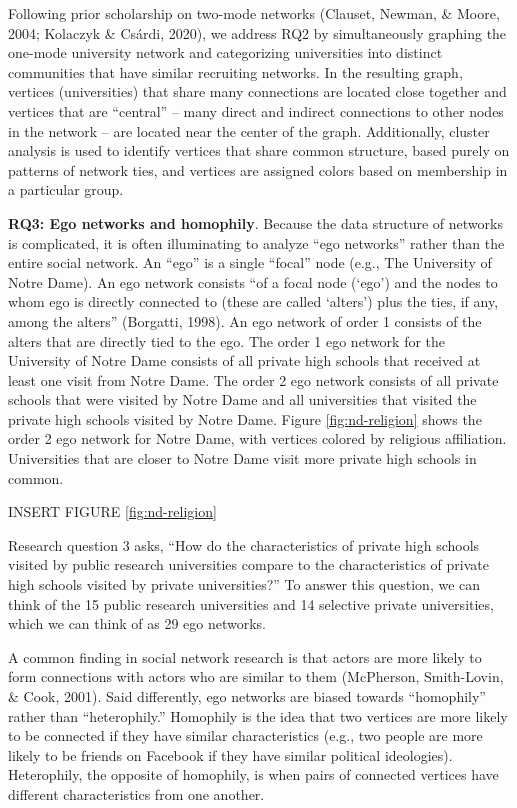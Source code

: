 \documentclass[
  12pt,
]{article}
\begin{document}
Following prior scholarship on two-mode networks (Clauset, Newman, \& Moore, 2004; Kolaczyk \& Csárdi, 2020), we address RQ2 by simultaneously graphing the one-mode university network and categorizing universities into distinct communities that have similar recruiting networks. In the resulting graph, vertices (universities) that share many connections are located close together and vertices that are ``central'' -- many direct and indirect connections to other nodes in the network -- are located near the center of the graph. Additionally, cluster analysis is used to identify vertices that share common structure, based purely on patterns of network ties, and vertices are assigned colors based on membership in a particular group.

\textbf{RQ3: Ego networks and homophily}. Because the data structure of networks is complicated, it is often illuminating to analyze ``ego networks'' rather than the entire social network. An ``ego'' is a single ``focal'' node (e.g., The University of Notre Dame). An ego network consists ``of a focal node (`ego') and the nodes to whom ego is directly connected to (these are called `alters') plus the ties, if any, among the alters'' (Borgatti, 1998). An ego network of order 1 consists of the alters that are directly tied to the ego. The order 1 ego network for the University of Notre Dame consists of all private high schools that received at least one visit from Notre Dame. The order 2 ego network consists of all private schools that were visited by Notre Dame and all universities that visited the private high schools visited by Notre Dame. Figure \ref{fig:nd-religion} shows the order 2 ego network for Notre Dame, with vertices colored by religious affiliation. Universities that are closer to Notre Dame visit more private high schools in common.

INSERT FIGURE \ref{fig:nd-religion}

Research question 3 asks, ``How do the characteristics of private high schools visited by public research universities compare to the characteristics of private high schools visited by private universities?'' To answer this question, we can think of the 15 public research universities and 14 selective private universities, which we can think of as 29 ego networks.

A common finding in social network research is that actors are more likely to form connections with actors who are similar to them (McPherson, Smith-Lovin, \& Cook, 2001). Said differently, ego networks are biased towards ``homophily'' rather than ``heterophily.'' Homophily is the idea that two vertices are more likely to be connected if they have similar characteristics (e.g., two people are more likely to be friends on Facebook if they have similar political ideologies). Heterophily, the opposite of homophily, is when pairs of connected vertices have different characteristics from one another.
\end{document}
